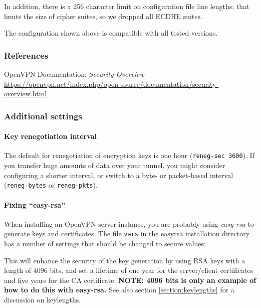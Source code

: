 In addition, there is a 256 character limit on configuration file line
lengths; that limits the size of cipher suites, so we dropped all
ECDHE suites.

The configuration shown above is compatible with all tested versions.


\subsubsection{References}
\begin{itemize*}
  \item OpenVPN Documentation: \emph{Security Overview} \url{https://openvpn.net/index.php/open-source/documentation/security-overview.html}
\end{itemize*}



\subsubsection{Additional settings}

\paragraph{Key renegotiation interval}
The default for renegotiation of encryption keys is one hour
(\verb|reneg-sec 3600|). If you
transfer huge amounts of data over your tunnel, you might consider
configuring a shorter interval, or switch to a byte- or packet-based
interval (\verb|reneg-bytes| or \verb|reneg-pkts|).

\paragraph{Fixing ``easy-rsa''}
When installing an OpenVPN server instance, you are probably using
\emph{easy-rsa} to generate keys and certificates.
The file \verb|vars| in the easyrsa installation directory has a
number of settings that should be changed to secure values:



This will enhance the security of the key generation by using RSA keys
with a length of 4096 bits, and set a lifetime of one year for the
server/client certificates and five years for the CA certificate. \textbf{NOTE: 4096 bits is only an example of how to do this with easy-rsa.} See also section \ref{section:keylengths} for a discussion on keylengths.

